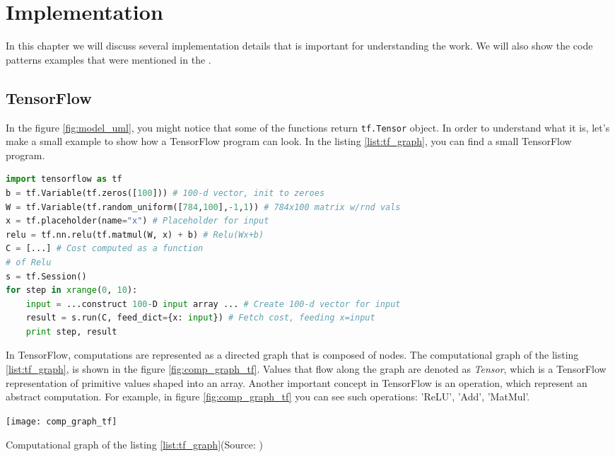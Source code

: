 \chapter{Implementation}
\label{ch:implementation}
In this chapter we will discuss several implementation details that
is important for understanding the work. We will also show
the code patterns examples that were mentioned in the .

\section{TensorFlow}
In the figure \ref{fig:model_uml}, you might notice that some of the functions
return \lstinline{tf.Tensor} object. In order to understand what it is,
let's make a small example to show how a TensorFlow program can look.
In the listing \ref{list:tf_graph}, you can find a small TensorFlow program.



\begin{lstlisting}[language=Python, caption={TensorFlow example \cite{tensorflow2015-whitepaper}},label={list:tf_graph}]
import tensorflow as tf
b = tf.Variable(tf.zeros([100])) # 100-d vector, init to zeroes
W = tf.Variable(tf.random_uniform([784,100],-1,1)) # 784x100 matrix w/rnd vals
x = tf.placeholder(name="x") # Placeholder for input
relu = tf.nn.relu(tf.matmul(W, x) + b) # Relu(Wx+b)
C = [...] # Cost computed as a function
# of Relu
s = tf.Session()
for step in xrange(0, 10):
	input = ...construct 100-D input array ... # Create 100-d vector for input
	result = s.run(C, feed_dict={x: input}) # Fetch cost, feeding x=input
	print step, result
\end{lstlisting}


In TensorFlow, computations are represented as a directed graph that is composed
of nodes. The computational graph of the listing \ref{list:tf_graph}, is shown
in the figure \ref{fig:comp_graph_tf}. Values that flow along the graph are denoted
as \emph{Tensor}, which is a TensorFlow representation of primitive values shaped
into an array. Another important concept in TensorFlow is an operation, which represent
an abstract computation. For example, in figure \ref{fig:comp_graph_tf} you can see
such operations: 'ReLU', 'Add', 'MatMul'.


\begin{center}
	\texttt{[image: comp\_graph\_tf]}
	\caption{Computational graph of the listing \ref{list:tf_graph}(Source: \cite{tensorflow2015-whitepaper})}
	\label{fig:comp_graph_tf}
\end{center}

